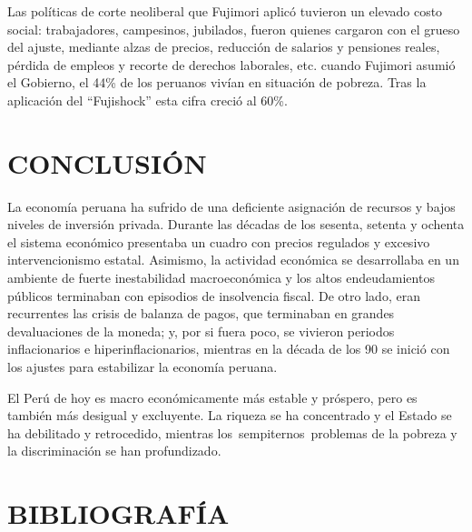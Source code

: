 \documentclass[
  jou,
  floatsintext,
  longtable,
  a4paper,
  nolmodern,
  notxfonts,
  notimes,
  colorlinks=true,linkcolor=blue,citecolor=blue,urlcolor=blue]{apa7}
\begin{document}
Las políticas de corte neoliberal que Fujimori aplicó tuvieron un
elevado costo social: trabajadores, campesinos, jubilados, fueron
quienes cargaron con el grueso del ajuste, mediante alzas de precios,
reducción de salarios y pensiones reales, pérdida de empleos y recorte
de derechos laborales, etc. cuando Fujimori asumió el Gobierno, el 44\%
de los peruanos vivían en situación de pobreza. Tras la aplicación del
``Fujishock'' esta cifra creció al 60\%.

\section{CONCLUSIÓN}\label{conclusiuxf3n}

La economía peruana ha sufrido de una deficiente asignación de recursos
y bajos niveles de inversión privada. Durante las décadas de los
sesenta, setenta y ochenta el sistema económico presentaba un cuadro con
precios regulados y excesivo intervencionismo estatal. Asimismo, la
actividad económica se desarrollaba en un ambiente de fuerte
inestabilidad macroeconómica y los altos endeudamientos públicos
terminaban con episodios de insolvencia fiscal. De otro lado, eran
recurrentes las crisis de balanza de pagos, que terminaban en grandes
devaluaciones de la moneda; y, por si fuera poco, se vivieron periodos
inflacionarios e hiperinflacionarios, mientras en la década de los 90 se
inició con los ajustes para estabilizar la economía peruana.

El Perú de hoy es macro económicamente más estable y próspero, pero es
también más desigual y excluyente. La riqueza se ha concentrado y el
Estado se ha debilitado y retrocedido, mientras
los~sempiternos~problemas de la pobreza y la discriminación se han
profundizado.

\section{BIBLIOGRAFÍA}\label{bibliografuxeda}
\end{document}
